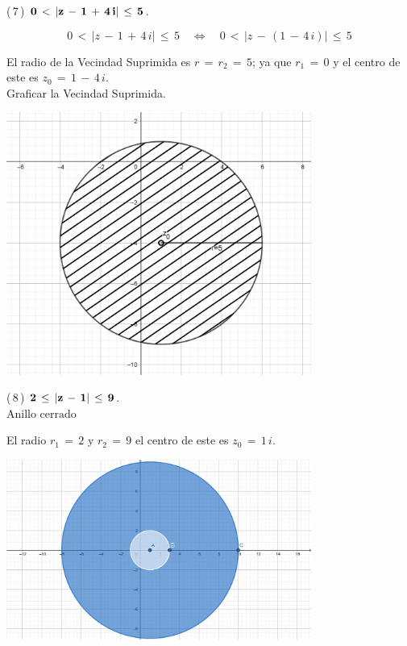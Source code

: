 \documentclass[a4paper,11pt,openany]{book}
\begin{document}
\textcolor{ao(english)}{(\,7\,)} $\bf{0\,<\,|z\,-\,1\,+\,4\,i|\,\leq\,5}$.

$$0\,<\,|z\,-\,1\,+\,4\,i|\,\leq\,5 \quad\iff\quad 0\,<\,|z\,-\,(1\,-\,4\,i)|\,\leq\,5$$

El radio de la Vecindad Suprimida es $r\,=\,r_{2}\,=\,5$; ya que $r_{1}\,=\,0$ y el centro de este es $z_{0}\,=\,1\,-\,4\,i$.\\

\textcolor{ao(english)}{} Graficar la Vecindad Suprimida.

\begin{center}
    \includegraphics[width=10cm]{Gra-Ej-7.png}
\end{center}

\textcolor{ao(english)}{(\,8\,)} $\bf{2\,\leq\,|z\,-\,1|\,\leq\,9}$.\\
$\text{Anillo cerrado}$

El radio $r_{1}\,=\,2$ y $r_{2}\,=\,9$ el centro de este es $z_{0}\,=\,1\,i$.\\

\begin{center}
    \includegraphics[width=10cm]{Gra-Ej-8.png}
\end{center}
\end{document}
